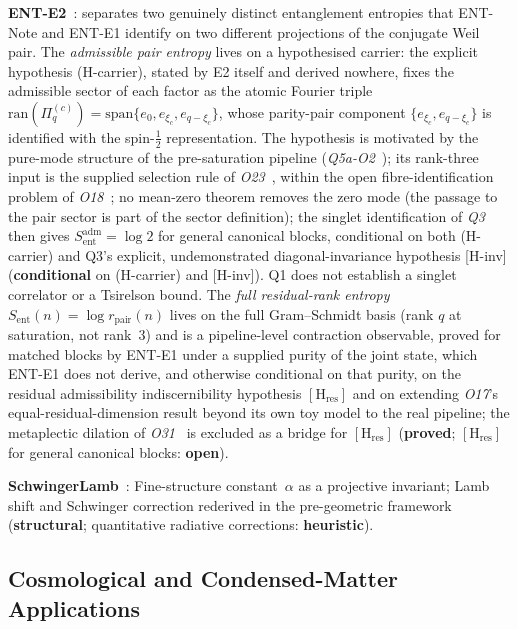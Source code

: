 \documentclass[11pt,a4paper]{article}
\newcommand{\sproved}{\textcolor{cproved}{\textbf{proved}}}
\newcommand{\sstruct}{\textcolor{cstruct}{\textbf{structural}}}
\newcommand{\sheur}{\textcolor{cheur}{\textbf{heuristic}}}
\newcommand{\sopen}{\textcolor{copen}{\textbf{open}}}
\newcommand{\scond}{\textcolor{ccond}{\textbf{conditional}}}
\begin{document}
    \textbf{ENT-E2}~\cite{Beau2026ent2}: separates two genuinely distinct entanglement entropies
    that ENT-Note and ENT-E1 identify on two different projections of the conjugate Weil pair.
    The \emph{admissible pair entropy} lives on a hypothesised carrier: the explicit hypothesis
    (H-carrier), stated by E2 itself and derived nowhere, fixes the admissible sector of each
    factor as the atomic Fourier triple
    $\mathrm{ran}(\Pi_q^{(c)}) = \mathrm{span}\{e_0, e_{\xi_c}, e_{q-\xi_c}\}$, whose parity-pair
    component $\{e_{\xi_c}, e_{q-\xi_c}\}$ is identified with the spin-$\tfrac12$ representation.
    The hypothesis is motivated by the pure-mode structure of the pre-saturation pipeline
    (\emph{Q5a-O2}~\cite{Beau2026q5ao2}); its rank-three input is the supplied selection rule of
    \emph{O23}~\cite{Beau2026a27}, within the open fibre-identification problem of
    \emph{O18}~\cite{Beau2026a22}; no mean-zero theorem removes the zero mode (the passage to
    the pair sector is part of the sector definition); the singlet identification of
    \emph{Q3}~\cite{Beau2026q3} then gives $S_{\mathrm{ent}}^{\mathrm{adm}}=\log 2$ for general
    canonical blocks, conditional on both (H-carrier) and Q3's explicit, undemonstrated
    diagonal-invariance hypothesis [H-inv] (\scond{} on (H-carrier) and [H-inv]). Q1 does not establish a singlet
    correlator
    or a Tsirelson bound. The \emph{full residual-rank entropy}
    $S_{\mathrm{ent}}(n)=\log r_{\mathrm{pair}}(n)$ lives on the full Gram--Schmidt basis (rank
    $q$ at saturation, not rank~3) and is a pipeline-level contraction observable, proved for matched
    blocks by ENT-E1 under a supplied purity of the joint state, which ENT-E1 does not derive, and
    otherwise conditional on that purity, on the residual admissibility
    indiscernibility hypothesis $[\mathrm{H}_{\mathrm{res}}]$ and on extending \emph{O17}'s
    equal-residual-dimension result beyond its own toy model to the real pipeline; the
    metaplectic dilation of \emph{O31}~\cite{Beau2026a35} is excluded as a bridge for
    $[\mathrm{H}_{\mathrm{res}}]$ (\sproved; $[\mathrm{H}_{\mathrm{res}}]$ for general canonical
    blocks: \sopen).

    \textbf{SchwingerLamb}~\cite{Beau2026f}: Fine-structure constant~$\alpha$ as a projective invariant;
    Lamb shift and Schwinger correction rederived in the pre-geometric framework
    (\sstruct; quantitative radiative corrections: \sheur).

  \subsection{Cosmological and Condensed-Matter Applications}
\end{document}

